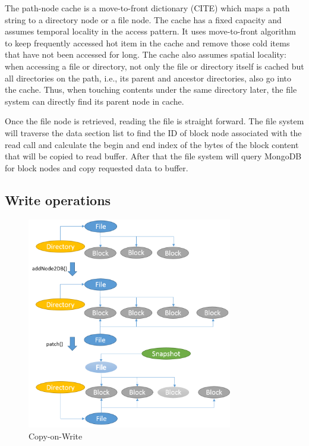     The path-node cache is a move-to-front dictionary (CITE) which maps a path string to a directory node or a file node. The cache has a fixed capacity and assumes temporal locality in the access pattern. It uses move-to-front algorithm to keep frequently accessed hot item in the cache and remove those cold items that have not been accessed for long. The cache also assumes spatial locality: when accessing a file or directory, not only the file or directory itself is cached but all directories on the path, i.e., its parent and ancestor directories, also go into the cache. Thus, when touching contents under the same directory later, the file system can directly find its parent node in cache.

    Once the file node is retrieved, reading the file is straight forward. The file system will traverse the data section list to find the ID of block node associated with the read call and calculate the begin and end index of the bytes of the block content that will be copied to read buffer. After that the file system will query MongoDB for block nodes and copy requested data to buffer.

\subsection{Write operations}

\begin{figure}[hbtp]
\centering
\includegraphics[width=0.8\textwidth]{Chapter-3/figs/fig10.png}
\caption{Copy-on-Write}
\label{fig:cow}
\end{figure}

